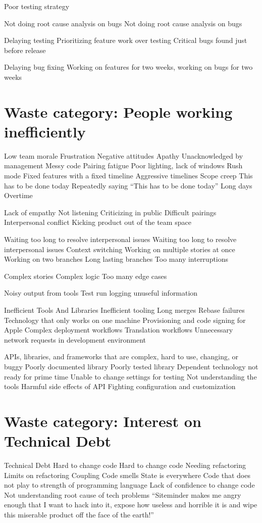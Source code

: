 Poor testing strategy

Not doing root cause analysis on bugs
Not doing root cause analysis on bugs

Delaying testing
Prioritizing feature work over testing
Critical bugs found just before release

Delaying bug fixing
Working on features for two weeks, working on bugs for two weeks



\section{Waste category: People working inefficiently}
Low team morale
Frustration
Negative attitudes
Apathy
Unacknowledged by management
Messy code
Pairing fatigue
Poor lighting, lack of windows
Rush mode
Fixed features with a fixed timeline
Aggressive timelines
Scope creep
This has to be done today
Repeatedly saying “This has to be done today”
Long days
Overtime

Lack of empathy
Not listening
Criticizing in public
Difficult pairings
Interpersonal conflict
Kicking product out of the team space

Waiting too long to resolve interpersonal issues
Waiting too long to resolve interpersonal issues
Context switching
Working on multiple stories at once
Working on two branches
Long lasting branches
Too many interruptions

Complex stories
Complex logic
Too many edge cases

Noisy output from tools
Test run logging unuseful information

Inefficient Tools And Libraries
Inefficient tooling
Long merges
Rebase failures
Technology that only works on one machine
Provisioning and code signing for Apple
Complex deployment workflows
Translation workflows
Unnecessary network requests in development environment

APIs, libraries, and frameworks that are complex, hard to use, changing, or buggy
Poorly documented library
Poorly tested library
Dependent technology not ready for prime time
Unable to change settings for testing
Not understanding the tools
Harmful side effects of API
Fighting configuration and customization

\section{Waste category: Interest on Technical Debt}
Technical Debt
Hard to change code
Hard to change code
Needing refactoring
Limits on refactoring
Coupling
Code smells
State is everywhere
Code that does not play to strength of programming language
Lack of confidence to change code
Not understanding root cause of tech problems
“Siteminder makes me angry enough that I want to hack into it, expose how useless and horrible it is and wipe this miserable product off the face of the earth!”




